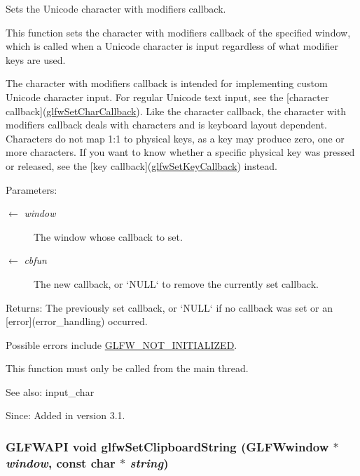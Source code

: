 Sets the Unicode character with modifiers callback. 

This function sets the character with modifiers callback of the specified window, which is called when a Unicode character is input regardless of what modifier keys are used.

The character with modifiers callback is intended for implementing custom Unicode character input. For regular Unicode text input, see the \mbox{[}character callback\mbox{]}(\hyperlink{group__input_g07b2959b23dc3e466ce7475746021002}{glfwSetCharCallback}). Like the character callback, the character with modifiers callback deals with characters and is keyboard layout dependent. Characters do not map 1:1 to physical keys, as a key may produce zero, one or more characters. If you want to know whether a specific physical key was pressed or released, see the \mbox{[}key callback\mbox{]}(\hyperlink{group__input_ga73bb92f628a2a0be9c132d56f19362c}{glfwSetKeyCallback}) instead.

\begin{Desc}
\item[Parameters:]
\begin{description}
\item[\mbox{$\leftarrow$} {\em window}]The window whose callback to set. \item[\mbox{$\leftarrow$} {\em cbfun}]The new callback, or `NULL` to remove the currently set callback. \end{description}
\end{Desc}
\begin{Desc}
\item[Returns:]The previously set callback, or `NULL` if no callback was set or an \mbox{[}error\mbox{]}(error\_\-handling) occurred.\end{Desc}
Possible errors include \hyperlink{group__errors_g2374ee02c177f12e1fa76ff3ed15e14a}{GLFW\_\-NOT\_\-INITIALIZED}.

This function must only be called from the main thread.

\begin{Desc}
\item[See also:]input\_\-char\end{Desc}
\begin{Desc}
\item[Since:]Added in version 3.1. \end{Desc}
\hypertarget{group__input_g7a580309bbc185a0459c3559021d2fd7}{
\subsubsection[glfwSetClipboardString]{\setlength{\rightskip}{0pt plus 5cm}GLFWAPI void glfwSetClipboardString ({\bf GLFWwindow} $\ast$ {\em window}, \/  const char $\ast$ {\em string})}}
\label{group__input_g7a580309bbc185a0459c3559021d2fd7}


